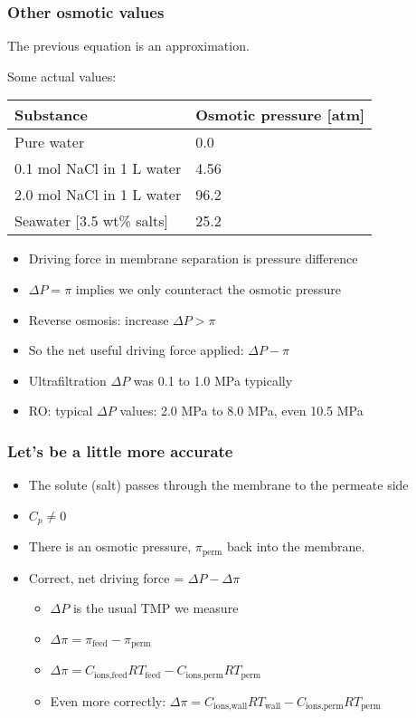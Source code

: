 \begin{frame}\frametitle{Other osmotic values}
	The previous equation is an approximation.

	\vspace{12pt}
	Some actual values:
	\begin{tabular}{ll}\\ \hline
	 	\textbf{Substance}  		& \textbf{Osmotic pressure [atm]} \\ \hline
		Pure water					& 0.0\\
		0.1 mol NaCl in 1 L water 	& 4.56\\
		2.0 mol NaCl in 1 L water	& 96.2\\
		Seawater [3.5 wt\% salts]	& 25.2\\
	\end{tabular}

	\begin{itemize}
		\item	Driving force in membrane separation is pressure difference
		\item	$\Delta P = \pi$ implies we only counteract the osmotic pressure
		\item	Reverse osmosis: increase $\Delta P > \pi$
		\item	So the net useful driving force applied: $\Delta P - \pi$
		\item	Ultrafiltration $\Delta P$ was 0.1 to 1.0 MPa typically
		\item	RO: typical $\Delta P$ values: 2.0 MPa to 8.0 MPa, even 10.5 MPa  %
	\end{itemize}
\end{frame}

\begin{frame}\frametitle{Let's be a little more accurate}
	\begin{itemize}
		\item	The solute (salt) passes through the membrane to the permeate side
		\item	$C_p \neq 0$
		\item	There is an osmotic pressure, $\pi_\text{perm}$ back into the membrane.
		\item	Correct, net driving force = $\Delta P - \Delta \pi$
		\begin{itemize}
			\item	$\Delta P$ is the usual TMP we measure
			\item	$\Delta \pi = \pi_\text{feed} - \pi_\text{perm}$
			\item	$\Delta \pi = C_\text{ions,feed}RT_\text{feed} - C_\text{ions,perm}RT_\text{perm}$
			\item	Even more correctly: $\Delta \pi = C_\text{ions,wall}RT_\text{wall} - C_\text{ions,perm}RT_\text{perm}$
		\end{itemize}
	\end{itemize}
\end{frame}

